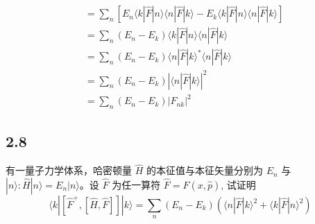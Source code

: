 \begin{equation}
\begin{aligned}
\\
&=\sum_n{\left[ E_n\langle k|\hat{F}|n\rangle \langle n|\hat{F}|k\rangle -E_k\langle k|\hat{F}|n\rangle \langle n|\hat{F}|k\rangle \right]}
\\
&=\sum_n{\left( E_n-E_k \right) \langle k|\hat{F}|n\rangle \langle n|\hat{F}|k\rangle}
\\
&=\sum_n{\left( E_n-E_k \right) \langle n|\hat{F}|k\rangle ^*\langle n|\hat{F}|k\rangle}
\\
&=\sum_n{\left( E_n-E_k \right) \left| \langle n|\hat{F}|k\rangle \right|^2}
\\
&=\sum_n{\left( E_n-E_k \right) \left| F_{nk} \right|^2}
    \end{aligned}
\end{equation}


\newpage
\subsection{2.8}
有一量子力学体系，哈密顿量 $\hat{H}$ 的本征值与本征矢量分别为 $E_n$ 与 $|n\rangle: \hat{H}|n\rangle = E_n|n\rangle$。设 $\hat{F}$ 为任一算符 $\hat{F} = \hat{F}(x, \hat{p})$, 试证明
$$\langle k|[\hat{F}^+, [\hat{H}, \hat{F}]] |k \rangle = \sum_{n} (E_n - E_k) \left( \langle n|\hat{F}|k\rangle^2 + \langle k|\hat{F}|n\rangle^2 \right)$$

